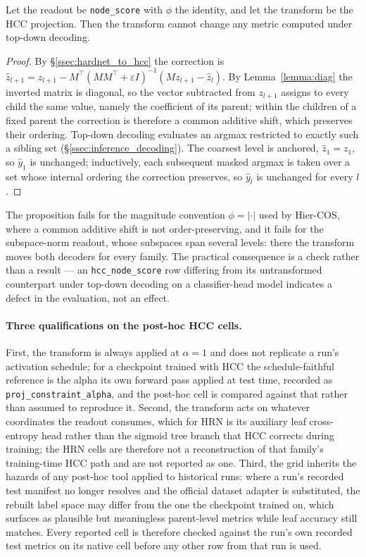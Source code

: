 \begin{proposition}
\label{prop:posthoc_hcc_topdown}
Let the readout be \texttt{node\_score} with $\phi$ the identity, and let the
transform be the HCC projection. Then the transform cannot change any metric
computed under top-down decoding.
\end{proposition}
\begin{proof}
By \S\ref{ssec:hardnet_to_hcc} the correction is
$\hat z_{l+1} = z_{l+1} - M^{\top}(MM^{\top}+\varepsilon I)^{-1}(Mz_{l+1}-\hat z_l)$.
By Lemma~\ref{lemma:diag} the inverted matrix is diagonal, so the vector
subtracted from $z_{l+1}$ assigns to every child the same value, namely the
coefficient of its parent; within the children of a fixed parent the correction is
therefore a common additive shift, which preserves their ordering. Top-down
decoding evaluates an argmax restricted to exactly such a sibling set
(\S\ref{ssec:inference_decoding}). The coarsest level is anchored, $\hat z_1=z_1$,
so $\hat y_1$ is unchanged; inductively, each subsequent masked argmax is taken
over a set whose internal ordering the correction preserves, so $\hat y_l$ is
unchanged for every $l$.
\end{proof}

The proposition fails for the magnitude convention $\phi=\lvert\cdot\rvert$ used
by Hier-COS, where a common additive shift is not order-preserving, and it fails
for the subspace-norm readout, whose subspaces span several levels: there the
transform moves both decoders for every family. The practical consequence is a
check rather than a result --- an \texttt{hcc\_node\_score} row differing from its
untransformed counterpart under top-down decoding on a classifier-head model
indicates a defect in the evaluation, not an effect.

\paragraph{Three qualifications on the post-hoc HCC cells.} First, the transform
is always applied at $\alpha=1$ and does not replicate a run's activation
schedule; for a checkpoint trained with HCC the schedule-faithful reference is the
alpha its own forward pass applied at test time, recorded as
\texttt{proj\_constraint\_alpha}, and the post-hoc cell is compared against that
rather than assumed to reproduce it. Second, the transform acts on whatever
coordinates the readout consumes, which for HRN is its auxiliary leaf
cross-entropy head rather than the sigmoid tree branch that HCC corrects during
training; the HRN cells are therefore not a reconstruction of that family's
training-time HCC path and are not reported as one. Third, the grid inherits the
hazards of any post-hoc tool applied to historical runs: where a run's recorded
test manifest no longer resolves and the official dataset adapter is substituted,
the rebuilt label space may differ from the one the checkpoint trained on, which
surfaces as plausible but meaningless parent-level metrics while leaf accuracy
still matches. Every reported cell is therefore checked against the run's own
recorded test metrics on its native cell before any other row from that run is
used.

